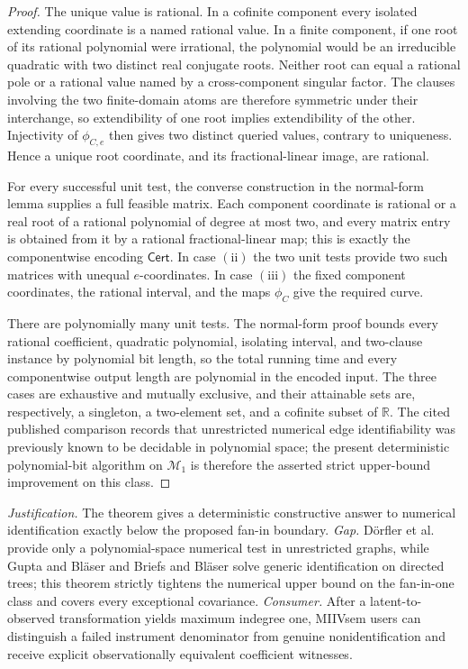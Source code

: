 \documentclass{article}
\begin{document}
\begin{proof}
The unique value is rational.  In a cofinite component every isolated extending coordinate is a named rational value.  In a finite component, if one root of its rational polynomial were irrational, the polynomial would be an irreducible quadratic with two distinct real conjugate roots.  Neither root can equal a rational pole or a rational value named by a cross-component singular factor.  The clauses involving the two finite-domain atoms are therefore symmetric under their interchange, so extendibility of one root implies extendibility of the other.  Injectivity of \(\phi_{C,e}\) then gives two distinct queried values, contrary to uniqueness.  Hence a unique root coordinate, and its fractional-linear image, are rational.

For every successful unit test, the converse construction in the normal-form lemma supplies a full feasible matrix.  Each component coordinate is rational or a real root of a rational polynomial of degree at most two, and every matrix entry is obtained from it by a rational fractional-linear map; this is exactly the componentwise encoding \(\mathsf{Cert}\).  In case \(\mathrm{(ii)}\) the two unit tests provide two such matrices with unequal \(e\)-coordinates.  In case \(\mathrm{(iii)}\) the fixed component coordinates, the rational interval, and the maps \(\phi_C\) give the required curve.

There are polynomially many unit tests.  The normal-form proof bounds every rational coefficient, quadratic polynomial, isolating interval, and two-clause instance by polynomial bit length, so the total running time and every componentwise output length are polynomial in the encoded input.  The three cases are exhaustive and mutually exclusive, and their attainable sets are, respectively, a singleton, a two-element set, and a cofinite subset of \(\mathbb R\).  The cited published comparison records that unrestricted numerical edge identifiability was previously known to be decidable in polynomial space; the present deterministic polynomial-bit algorithm on \(\mathcal M_1\) is therefore the asserted strict upper-bound improvement on this class.
\end{proof}
\par\smallskip\noindent \textit{Justification.} The theorem gives a deterministic constructive answer to numerical identification exactly below the proposed fan-in boundary. \textit{Gap.} Dörfler et al. provide only a polynomial-space numerical test in unrestricted graphs, while Gupta and Bläser and Briefs and Bläser solve generic identification on directed trees; this theorem strictly tightens the numerical upper bound on the fan-in-one class and covers every exceptional covariance. \textit{Consumer.} After a latent-to-observed transformation yields maximum indegree one, MIIVsem users can distinguish a failed instrument denominator from genuine nonidentification and receive explicit observationally equivalent coefficient witnesses.
\end{document}
